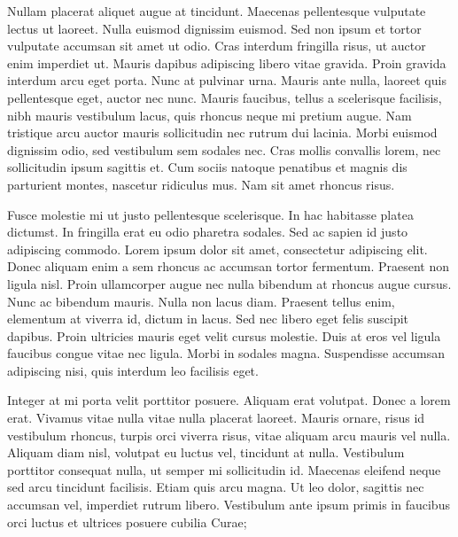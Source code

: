 Nullam placerat aliquet augue at tincidunt. Maecenas pellentesque
vulputate lectus ut laoreet. Nulla euismod dignissim euismod. Sed
non ipsum et tortor vulputate accumsan sit amet ut odio. Cras interdum
fringilla risus, ut auctor enim imperdiet ut. Mauris dapibus adipiscing
libero vitae gravida. Proin gravida interdum arcu eget porta. Nunc
at pulvinar urna. Mauris ante nulla, laoreet quis pellentesque eget,
auctor nec nunc. Mauris faucibus, tellus a scelerisque facilisis,
nibh mauris vestibulum lacus, quis rhoncus neque mi pretium augue.
Nam tristique arcu auctor mauris sollicitudin nec rutrum dui lacinia.
Morbi euismod dignissim odio, sed vestibulum sem sodales nec. Cras
mollis convallis lorem, nec sollicitudin ipsum sagittis et. Cum sociis
natoque penatibus et magnis dis parturient montes, nascetur ridiculus
mus. Nam sit amet rhoncus risus.

Fusce molestie mi ut justo pellentesque scelerisque. In hac habitasse
platea dictumst. In fringilla erat eu odio pharetra sodales. Sed ac
sapien id justo adipiscing commodo. Lorem ipsum dolor sit amet, consectetur
adipiscing elit. Donec aliquam enim a sem rhoncus ac accumsan tortor
fermentum. Praesent non ligula nisl. Proin ullamcorper augue nec nulla
bibendum at rhoncus augue cursus. Nunc ac bibendum mauris. Nulla non
lacus diam. Praesent tellus enim, elementum at viverra id, dictum
in lacus. Sed nec libero eget felis suscipit dapibus. Proin ultricies
mauris eget velit cursus molestie. Duis at eros vel ligula faucibus
congue vitae nec ligula. Morbi in sodales magna. Suspendisse accumsan
adipiscing nisi, quis interdum leo facilisis eget.

Integer at mi porta velit porttitor posuere. Aliquam erat volutpat.
Donec a lorem erat. Vivamus vitae nulla vitae nulla placerat laoreet.
Mauris ornare, risus id vestibulum rhoncus, turpis orci viverra risus,
vitae aliquam arcu mauris vel nulla. Aliquam diam nisl, volutpat eu
luctus vel, tincidunt at nulla. Vestibulum porttitor consequat nulla,
ut semper mi sollicitudin id. Maecenas eleifend neque sed arcu tincidunt
facilisis. Etiam quis arcu magna. Ut leo dolor, sagittis nec accumsan
vel, imperdiet rutrum libero. Vestibulum ante ipsum primis in faucibus
orci luctus et ultrices posuere cubilia Curae;


